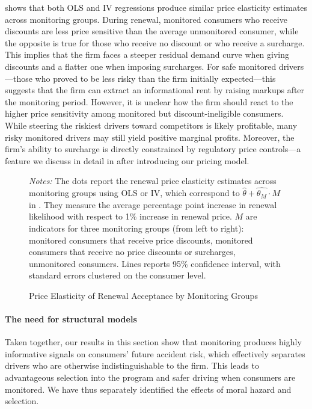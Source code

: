  shows that both OLS and IV regressions produce similar price elasticity estimates across monitoring groups.
During renewal, monitored consumers who receive discounts are less price sensitive than the average unmonitored consumer, while the opposite is true for those who receive no discount or who receive a surcharge. This implies that the firm faces a steeper residual demand curve when giving discounts and a flatter one when imposing surcharges. For safe monitored drivers---those who proved to be less risky than the firm initially expected---this suggests that the firm can extract an informational rent by raising markups after the monitoring period.
However, it is unclear how the firm should react to the higher price sensitivity among monitored but discount-ineligible consumers. While steering the riskiest drivers toward competitors is likely profitable, many risky monitored drivers may still yield positive marginal profits. Moreover, the firm's ability to surcharge is directly constrained by regulatory price controls---a feature we discuss in detail in  after introducing our pricing model.

\begin{figure}[htbp!]
\centering
{}
\caption{Price Elasticity of Renewal Acceptance by Monitoring Groups \label{fig:rf-demand}}
\vspace{0.1cm}
\begin{minipage}{0.95\textwidth} %
    {\footnotesize \emph{Notes: }The dots report the renewal price elasticity estimates across monitoring groups using OLS or IV, which correspond to $\hat{\theta} + \hat{\theta_M} \cdot M$ in . They measure the average percentage point increase in renewal likelihood with respect to 1\% increase in renewal price. $M$ are indicators for three monitoring groups (from left to right): monitored consumers that receive price discounts, monitored consumers that receive no price discounts or surcharges, unmonitored consumers. Lines reports 95\% confidence interval, with standard errors clustered on the consumer level. \par}
\end{minipage}
\end{figure}

\paragraph{The need for structural models}
Taken together, our results in this section show that monitoring produces highly informative signals on consumers' future accident risk, which effectively separates drivers who are otherwise indistinguishable to the firm. This leads to advantageous selection into the program and safer driving when consumers are monitored. We have thus separately identified the effects of moral hazard and selection.

